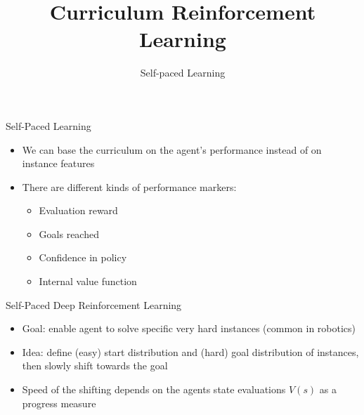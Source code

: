 \documentclass[aspectratio=169]{../latex_main/tntbeamer}  %
\title[Curriculum RL]{Curriculum Reinforcement Learning}
\subtitle{Self-paced Learning}
\begin{document}
	
	\maketitle

\begin{frame}[c]{Self-Paced Learning}
	
	\begin{itemize}
		\item We can base the curriculum on the agent's performance instead of on instance features
		\item There are different kinds of performance markers:
		\pause
		\begin{itemize}
			\item Evaluation reward
			\item Goals reached
			\item Confidence in policy
			\item Internal value function
		\end{itemize}
	\end{itemize}
	
\end{frame}

\begin{frame}[c]{Self-Paced Deep Reinforcement Learning~}
	
	\begin{itemize}
		\item Goal: enable agent to solve specific very hard instances (common in robotics)
		\item Idea: define (easy) start distribution and (hard) goal distribution of instances, then slowly shift towards the goal
		\item Speed of the shifting depends on the agents state evaluations $V(s)$ as a progress measure
	\end{itemize}
	
\end{frame}
\end{document}
